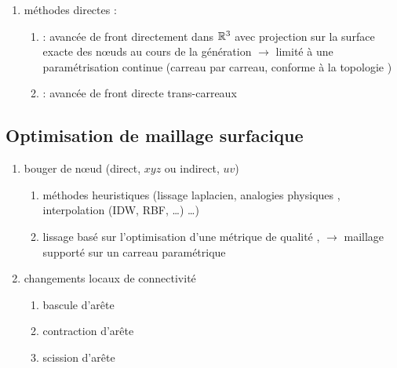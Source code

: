 \begin{enumerate}
	\item méthodes directes : 
	\begin{enumerate}
		\item \cite{lau1996} : avancée de front directement dans $\mathbb{R}^3$ avec projection sur la surface exacte des n\oe uds au cours de la génération $\to$ limité à une paramétrisation continue (\ie carreau par carreau, conforme à la topologie \brep)
		\item \cite{foucault2013} : avancée de front directe trans-carreaux
	\end{enumerate}
\end{enumerate}







\subsection{Optimisation de maillage surfacique}


\begin{enumerate}
	\item bouger de n\oe ud (direct, \ie $xyz$ ou indirect, \ie $uv$)
	\begin{enumerate}
		\item méthodes heuristiques (lissage laplacien, analogies physiques \cite{farhat1998}, interpolation (IDW, RBF, \ldots) \ldots)
		\item lissage basé sur l'optimisation d'une métrique de qualité \cite{freitag1995, canann1998, jiao2008}, \cite{gargallo2014} $\to$ maillage supporté sur un carreau paramétrique
	\end{enumerate}
	\item changements locaux de connectivité
	\begin{enumerate}
		\item bascule d'arête
		\item contraction d'arête
		\item scission d'arête
	\end{enumerate}
\end{enumerate}






